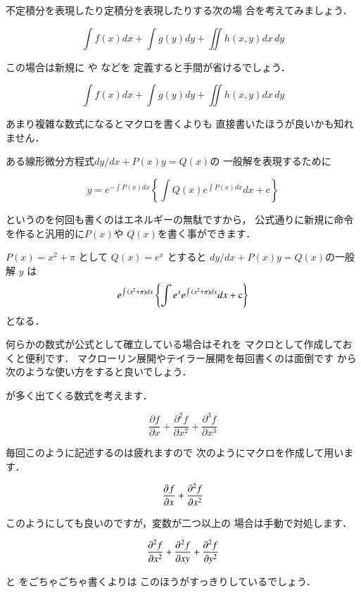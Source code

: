 不定積分を表現したり定積分を表現したりする次の場
合を考えてみましょう．
\begin{InOut}
\usepackage{txfonts}
\[ \int f(x)dx + \int g(y)dy + 
   \iint h(x,y)dx\,dy  \]
\end{InOut}
この場合は新規に  や  などを
定義すると手間が省けるでしょう．
\begin{InOut}
\newcommand\intx[1]{\int#1dx}
\newcommand\inty[1]{\int#1dy}
\newcommand\iintxy[1]{\iint#1dx\,dy}
\[ \intx{f(x)} + \inty{g(y)} + 
 \iintxy{h(x,y)} \]
\end{InOut}
あまり複雑な数式になるとマクロを書くよりも
直接書いたほうが良いかも知れません．

ある線形微分方程式\(dy/dx+P(x)y=Q(x)\)の
一般解を表現するために
\begin{InOut}
\[ y=e^{-\int P(x)dx}\left\{
   \int{Q(x)e^{\int P(x)dx}dx + 
   \mathrm{c}}  \right\} \] 
\end{InOut}
というのを何回も書くのはエネルギーの無駄ですから，
公式通りに新規に命令を作ると汎用的に$P(x)$や
$Q(x)$を書く事ができます．
\begin{InOut}
\newcommand{\my}{%
  \ensuremath{dy/dx+P(x)y=Q(x)}}
\newcommand{\mypq}[2]{\ensuremath{%
   e^{\int{#1}dx}\left\{\int{{#2}%
   e^{\int{#1}dx}dx+\mathrm{c}}%
   \right\}}}
$P(x)=x^2+\pi$ として $Q(x)=e^x$
とすると{\my}の一般解 $y$ は \[
\mypq{(x^2+\pi)}{e^x}\]となる．
\end{InOut}

何らかの数式が公式として確立している場合はそれを
マクロとして作成しておくと便利です．%
マクローリン展開やテイラー展開を毎回書くのは面倒です
から次のような使い方をすると良いでしょう．

が多く出てくる数式を考えます．
\begin{InOut}
\[\frac{\partial f}{\partial x}+
  \frac{\partial^2f}{\partial x^2}+
  \frac{\partial^3f}{\partial x^3}\]
\end{InOut}
毎回このように記述するのは疲れますので
次のようにマクロを作成して用います．
\begin{InOut}
\newcommand{\pdif}[3][]{\frac{%
 \partial^{#1}{#2}}{\partial{#3}^{#1}}}
\[ \pdif{f}{x}+\pdif[2]{f}{x} \]
\end{InOut}
このようにしても良いのですが，変数が二つ以上の
場合は手動で対処します．
\begin{InOut}
\newcommand{\pdif}[3][]{\frac{%
  \partial^{#1}{#2}}{\partial{#3}^{#1}}}
\[ \pdif[2]{f}{x} + \pdif{\sp2f}{xy} + 
   \pdif[2]{f}{y} \]
\end{InOut}
 と をごちゃごちゃ書くよりは
このほうがすっきりしているでしょう．

